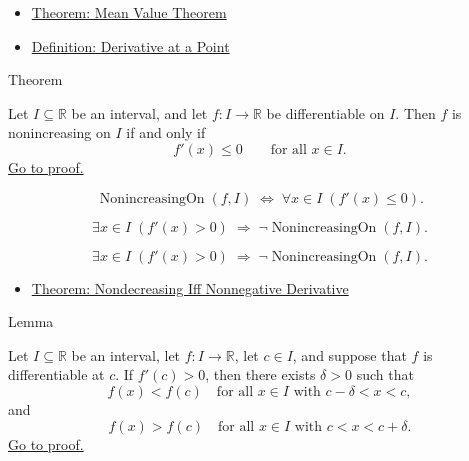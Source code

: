 \begin{dependencies}
\begin{itemize}
  \item \hyperref[thm:mean-value-theorem]{Theorem: Mean Value Theorem}
  \item \hyperref[def:derivative-at-a-point]{Definition: Derivative at a Point}
\end{itemize}
\end{dependencies}


\begin{theorembox}{Theorem}
\begin{theorem}
\label{thm:nonincreasing-iff-nonpos-derivative}
Let $I \subseteq \mathbb{R}$ be an interval, and let $f : I \to \mathbb{R}$ be differentiable on $I$. Then $f$ is nonincreasing on $I$ if and only if
\[
f'(x) \leq 0 \qquad \text{for all } x \in I.
\]
\hyperref[prf:nonincreasing-iff-nonpos-derivative]{Go to proof.}
\end{theorem}
\end{theorembox}

\begin{remark*}
\[
\operatorname{NonincreasingOn}(f,I)
\;\iff\;
\forall x \in I\;(f'(x) \leq 0).
\]
\end{remark*}

\begin{remark*}
\[
\exists x \in I\;(f'(x) > 0) \;\Rightarrow\; \lnot\operatorname{NonincreasingOn}(f,I).
\]
\end{remark*}

\begin{remark*}
\[
\exists x \in I\;(f'(x) > 0) \;\Rightarrow\; \lnot\operatorname{NonincreasingOn}(f,I).
\]
\end{remark*}

\begin{dependencies}
\begin{itemize}
  \item \hyperref[thm:nondecreasing-iff-nonneg-derivative]{Theorem: Nondecreasing Iff Nonnegative Derivative}
\end{itemize}
\end{dependencies}


\begin{lemmabox}{Lemma}
\begin{lemma}
\label{lem:positive-derivative-implies-locally-increasing}
Let $I \subseteq \mathbb{R}$ be an interval, let $f : I \to \mathbb{R}$, let $c \in I$, and suppose that $f$ is differentiable at $c$. If $f'(c) > 0$, then there exists $\delta > 0$ such that
\[
f(x) < f(c) \quad \text{for all } x \in I \text{ with } c - \delta < x < c,
\]
and
\[
f(x) > f(c) \quad \text{for all } x \in I \text{ with } c < x < c + \delta.
\]
\hyperref[prf:positive-derivative-implies-locally-increasing]{Go to proof.}
\end{lemma}
\end{lemmabox}

